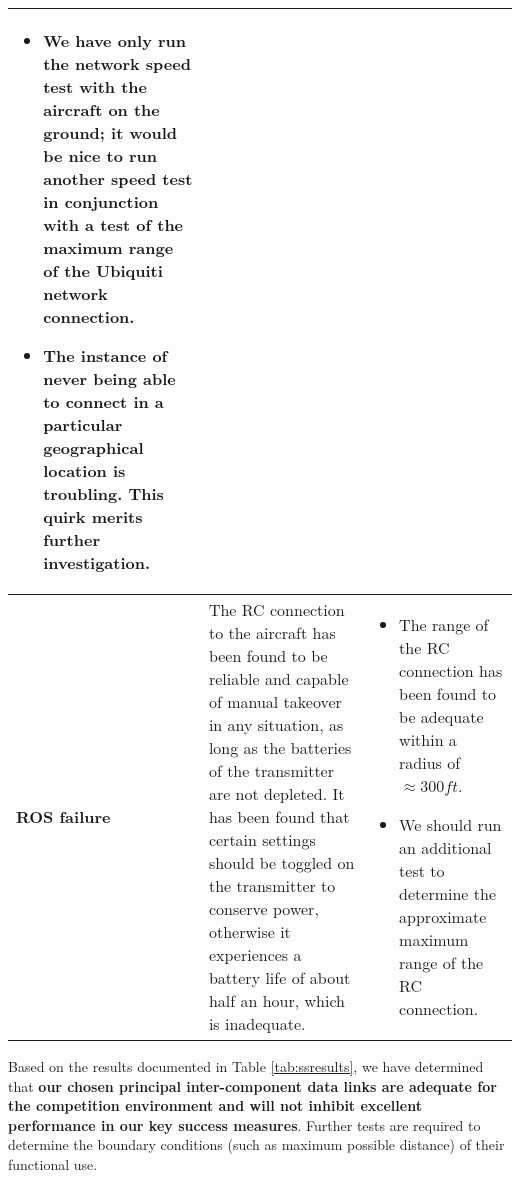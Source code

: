 \documentclass[]{auvsi_doc}
\begin{document}
\begin{center}
\begin{longtable}[H]{|P{3cm}|P{5.75cm}|P{5.75cm}|}
\begin{itemize}
		\item We have only run the network speed test with the aircraft on the ground; it would be nice to run another speed test in conjunction with a test of the maximum range of the Ubiquiti network connection.
		\item The instance of never being able to connect in a particular geographical location is troubling. This quirk merits further investigation.
	\end{itemize} \\
		\hline
		\textbf{ROS failure}	& The RC connection to the aircraft has been found to be reliable and capable of manual takeover in any situation, as long as the batteries of the transmitter are not depleted. It has been found that certain settings should be toggled on the transmitter to conserve power, otherwise it experiences a battery life of about half an hour, which is inadequate. & \begin{itemize}
			\item The range of the RC connection has been found to be adequate within a radius of $\approx 300ft$.
			\item We should run an additional test to determine the approximate maximum range of the RC connection.
		\end{itemize} \\
		\hline
	\end{longtable}
\end{center}

Based on the results documented in Table \ref{tab:ssresults}, we have determined that \textbf{our chosen principal inter-component data links are adequate for the competition environment and will not inhibit excellent performance in our key success measures}. Further tests are required to determine the boundary conditions (such as maximum possible distance) of their functional use.
\end{document}
